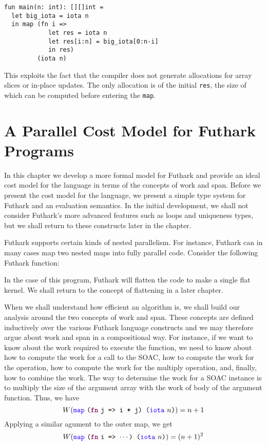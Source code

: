 \documentclass[oneside,11pt]{book}
\begin{document}
\begin{lstlisting}
fun main(n: int): [][]int =
  let big_iota = iota n
  in map (fn i =>
            let res = iota n
            let res[i:n] = big_iota[0:n-i]
            in res)
         (iota n)
\end{lstlisting}

This exploits the fact that the compiler does not generate allocations
for array slices or in-place updates.  The only allocation is of the
initial \texttt{res}, the size of which can be computed before
entering the \texttt{map}.

\chapter{A Parallel Cost Model for Futhark Programs}
\label{chap:costmodel}
In this chapter we develop a more formal model for Futhark and provide
an ideal cost model for the language in terms of the concepts of work
and span. Before we present the cost model for the language, we
present a simple type system for Futhark and an evaluation
semantics. In the initial development, we shall not consider Futhark's
more advanced features such as loops and uniqueness types, but we
shall return to these constructs later in the chapter.

Futhark supports certain kinds of nested parallelism. For instance,
Futhark can in many cases map two nested maps into fully parallel
code. Consider the following Futhark function:


\noindent
In the case of this program, Futhark will flatten the code to make a
single flat kernel. We shall return to the concept of flattening in a
later chapter.

When we shall understand how efficient an algorithm is, we shall build
our analysis around the two concepts of work and span. These concepts
are defined inductively over the various Futhark language constructs
and we may therefore argue about work and span in a compositional
way. For instance, if we want to know about the work required to
execute the  function, we need to know about how to
compute the work for a call to the  SOAC, how to compute the
work for the  operation, how to compute the work for the
multiply operation, and, finally, how to combine the work. The way to
determine the work for a  SOAC instance is to multiply the
size of the argument array with the work of body of the argument
function. Thus, we have
$$ W(\fop{map}~\kw{(}\fw{fn}~\kw{j => i * j) (}\fop{iota}~\kw{$n$)}) = n+1 $$
Applying a similar agument to the outer map, we get
$$W(\fop{map}~\kw{(}\fw{fn}~\kw{i => $\cdots$) (}\fop{iota}~\kw{$n$)}) = (n+1)^2 $$
\end{document}

